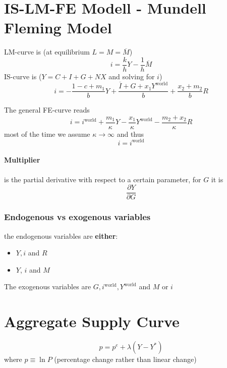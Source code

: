 \documentclass[a4paper] {scrartcl}
\begin{document}
\section{IS-LM-FE Modell - Mundell Fleming Model}
LM-curve is (at equilibrium $L=M=\overline M$)
\begin{equation}
	i = \frac{k}{h}Y-\frac{1}{h}\overline M
\end{equation}
IS-curve is ($Y = C+I+G+NX$ and solving for $i$)
\begin{equation}
	i = -\frac{1-c+m_1}{b}Y+ \frac{\overline I + G + x_1Y^{\text{world}}}{b}+\frac{x_2+m_2}{b}R
\end{equation}

The general FE-curve reads
\begin{equation}
	i = i^{\text{world}}+\frac{m_1}{\kappa}Y-\frac{x_1}{\kappa}Y^{\text{world}}-\frac{m_2+x_2}{\kappa}R
\end{equation}
most of the time we assume $\kappa\rightarrow\infty$ and thus
\begin{equation}
	i = i^{\text{world}}
\end{equation}

\paragraph{Multiplier} %
\label{par:multiplier}
is the partial derivative with respect to a certain parameter, for $G$ it is	
\begin{equation}
	\frac{\partial Y}{\partial G}
\end{equation}

\subsubsection{Endogenous vs exogenous variables}
the endogenous variables are \textbf{either}:
\begin{itemize}
	\item $Y, i$ and $R$
	\item $Y$, $i$ and $M$
\end{itemize}
The exogenous variables are $G, i^{\text{world}}, Y^{\text{world}}$ and $M$ or $i$

\section{Aggregate Supply Curve}
\begin{equation}
	p = p^e+\lambda(Y-Y^*)
\end{equation}
where $p\equiv\ln{P}$ (percentage change rather than linear change)
\end{document}
